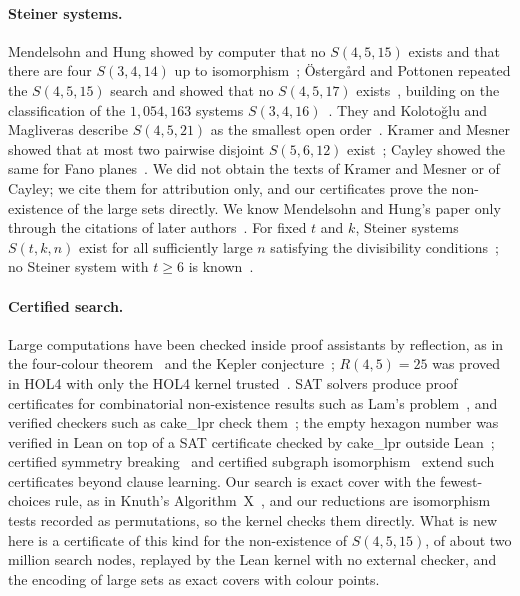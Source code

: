 \documentclass[11pt]{article}
\theoremstyle{plain}
\begin{document}
\paragraph{Steiner systems.} Mendelsohn and Hung showed by computer that no $S(4,5,15)$ exists and that there are four $S(3,4,14)$ up to isomorphism~\cite{MendelsohnHung,KOP}; \"Osterg\aa{}rd and Pottonen repeated the $S(4,5,15)$ search and showed that no $S(4,5,17)$ exists~\cite{OstergardPottonen}, building on the classification of the $1{,}054{,}163$ systems $S(3,4,16)$~\cite{KOP}. They and Koloto\u{g}lu and Magliveras describe $S(4,5,21)$ as the smallest open order~\cite{OstergardPottonen,KolotogluMagliveras}. Kramer and Mesner showed that at most two pairwise disjoint $S(5,6,12)$ exist~\cite{KramerMesner}; Cayley showed the same for Fano planes~\cite{Cayley}. We did not obtain the texts of Kramer and Mesner or of Cayley; we cite them for attribution only, and our certificates prove the non-existence of the large sets directly. We know Mendelsohn and Hung's paper only through the citations of later authors~\cite{OstergardPottonen}. For fixed $t$ and $k$, Steiner systems $S(t,k,n)$ exist for all sufficiently large $n$ satisfying the divisibility conditions~\cite{Keevash}; no Steiner system with $t \ge 6$ is known~\cite{Epoch}.

\paragraph{Certified search.} Large computations have been checked inside proof assistants by reflection, as in the four-colour theorem~\cite{FourColour} and the Kepler conjecture~\cite{Flyspeck}; $R(4,5)=25$ was proved in HOL4 with only the HOL4 kernel trusted~\cite{R45}. SAT solvers produce proof certificates for combinatorial non-existence results such as Lam's problem~\cite{Lam}, and verified checkers such as cake\_lpr check them~\cite{cakelpr}; the empty hexagon number was verified in Lean on top of a SAT certificate checked by cake\_lpr outside Lean~\cite{Hexagon}; certified symmetry breaking~\cite{VeriPB-sym} and certified subgraph isomorphism~\cite{SubgraphIso} extend such certificates beyond clause learning. Our search is exact cover with the fewest-choices rule, as in Knuth's Algorithm~X~\cite{DLX}, and our reductions are isomorphism tests recorded as permutations, so the kernel checks them directly. What is new here is a certificate of this kind for the non-existence of $S(4,5,15)$, of about two million search nodes, replayed by the Lean kernel with no external checker, and the encoding of large sets as exact covers with colour points.
\end{document}
